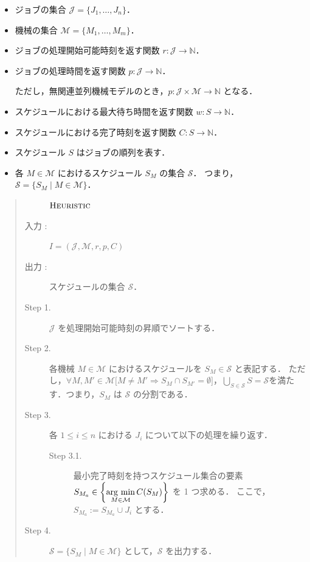 \documentclass[12pt]{optlab-bachelor}
\newcommand{\argmin}{\mathop{\rm arg~min}\limits}
\begin{document}
\begin{itemize}
  \item ジョブの集合 $\mathcal{J} = \{J_1,\ldots,J_n\}$．
  \item 機械の集合 $\mathcal{M} = \{M_1,\ldots,M_m\}$．
  \item ジョブの処理開始可能時刻を返す関数 $r : \mathcal{J} \to \mathbb{N}$．
  \item ジョブの処理時間を返す関数 $p : \mathcal{J} \to \mathbb{N}$．

  ただし，無関連並列機械モデルのとき，$p : \mathcal{J} \times \mathcal{M} \to \mathbb{N}$ となる．
  \item スケジュールにおける最大待ち時間を返す関数 $w : S \to \mathbb{N}$．
  \item スケジュールにおける完了時刻を返す関数 $C : S \to \mathbb{N}$．
  \item スケジュール $S$ はジョブの順列を表す．
  \item 各 $M \in \mathcal{M}$ におけるスケジュール $S_M$ の集合 $\mathcal{S}$．
  つまり，$\mathcal{S} = \{S_M \mid M \in \mathcal{M}\}$．
\end{itemize}

\begin{quote}
  \begin{description}
    \item[] ${\mbox {\bf {\sc Heuristic}}}$
    \item[入力 :] $I = (\mathcal{J}, \mathcal{M},r,p,C)$
    \item[出力 :] スケジュールの集合 $\mathcal{S}$．
  \end{description}
  \begin{description}
    \item[Step 1.]
    $\mathcal{J}$ を処理開始可能時刻の昇順でソートする．
    \item[Step 2.]
    各機械 $M \in \mathcal{M}$ におけるスケジュールを $S_M \in \mathcal{S}$ と表記する．
    ただし，$\forall M, M' \in \mathcal{M}\big[M \neq M' \Rightarrow S_M \cap S_{M'} = \emptyset \big]$，$\displaystyle \bigcup_{S \in \mathcal{S}}S = \mathcal{S}$を満たす．つまり，$S_M$ は $\mathcal{S}$ の分割である．
    \item[Step 3.]
    各 $1 \le i \le n$ における $J_i$ について以下の処理を繰り返す．
    \begin{description}
      \item[Step 3.1.]
      最小完了時刻を持つスケジュール集合の要素 $S_{M_a} \in {\displaystyle \left\{\argmin_{M \in \mathcal{M}}C(S_M)\right\}}$ を 1 つ求める．
      ここで，$S_{M_a} := S_{M_a} \cup J_i$ とする．
    \end{description}
    \item[Step 4.]
    $\mathcal{S} = \{ S_M \mid M \in \mathcal{M}\}$ として，$\mathcal{S}$ を出力する．
  \end{description}
\end{quote}
\end{document}

